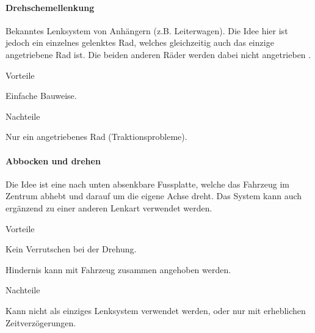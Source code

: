 \documentclass[../main.tex]{subfiles}
\begin{document}
\paragraph{Drehschemellenkung} \label{recherche-drehschemellenkung}

Bekanntes Lenksystem von Anhängern (z.B. Leiterwagen). Die Idee hier ist jedoch ein einzelnes gelenktes Rad, welches gleichzeitig auch das einzige angetriebene Rad ist. Die beiden anderen Räder werden dabei nicht angetrieben \cite{lenkungsarten}.

\begin{minipage}[t]{0.48\textwidth}
    \begin{items}
      \item [Vorteile]
      \item Einfache Bauweise.
 \end{items}
\end{minipage}
\hfill
\begin{minipage}[t]{0.48\textwidth}
    \begin{items}
      \item [Nachteile]
      \item Nur ein angetriebenes Rad (Traktionsprobleme).
    \end{items}
\end{minipage}

\paragraph{Abbocken und drehen} \label{recherche-abbocken-und-drehen}

Die Idee ist eine nach unten absenkbare Fussplatte, welche das Fahrzeug im Zentrum abhebt und darauf um die eigene Achse dreht. Das System kann auch ergänzend zu einer anderen Lenkart verwendet werden.

\begin{minipage}[t]{0.48\textwidth}
    \begin{items}
      \item [Vorteile]
      \item Kein Verrutschen bei der Drehung.
      \item Hindernis kann mit Fahrzeug zusammen angehoben werden.
 \end{items}
\end{minipage}
\hfill
\begin{minipage}[t]{0.48\textwidth}
    \begin{items}
      \item [Nachteile]
      \item Kann nicht als einziges Lenksystem verwendet werden, oder nur mit erheblichen Zeitverzögerungen.
    \end{items}
\end{minipage}
\end{document}
